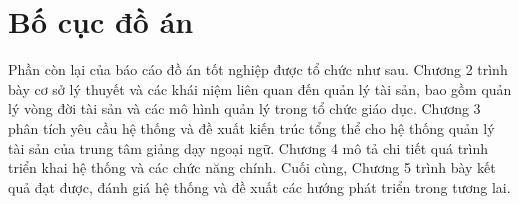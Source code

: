 \documentclass[../DoAn.tex]{subfiles}
\begin{document}
\section{Bố cục đồ án}

Phần còn lại của báo cáo đồ án tốt nghiệp được tổ chức như sau. Chương 2 trình bày cơ sở lý thuyết và các khái niệm liên quan đến quản lý tài sản, bao gồm quản lý vòng đời tài sản và các mô hình quản lý trong tổ chức giáo dục. Chương 3 phân tích yêu cầu hệ thống và đề xuất kiến trúc tổng thể cho hệ thống quản lý tài sản của trung tâm giảng dạy ngoại ngữ. Chương 4 mô tả chi tiết quá trình triển khai hệ thống và các chức năng chính. Cuối cùng, Chương 5 trình bày kết quả đạt được, đánh giá hệ thống và đề xuất các hướng phát triển trong tương lai.
\end{document}
